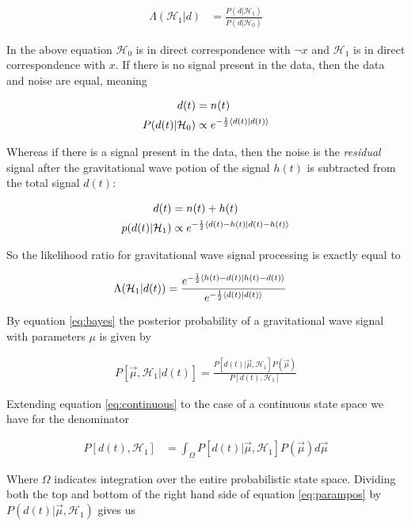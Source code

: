 \begin{align}
\Lambda(\mathcal{H}_1|d) &= \frac{P(d|\mathcal{H}_1)}{P(d|\mathcal{H}_0)}
\end{align}

In the above equation $\mathcal{H}_0$ is in direct correspondence with $\neg x$ and $\mathcal{H}_1$ is in direct correspondence with $x$. If there is no signal present in the data, then the data and noise are equal, meaning 

\begin{align}
d(t) &= n(t) \\
P(d(t)|\mathcal{H}_0) &\propto e^{-\frac{1}{2}\braket{d(t)|d(t)}}
\end{align} 

Whereas if there is a signal present in the data, then the noise is the \textit{residual} signal after the gravitational wave potion of the signal $h(t)$ is subtracted from the total signal $d(t)$: 

\begin{align}
d(t) &= n(t) + h(t) \\
p(d(t)|\mathcal{H}_1) &\propto e^{-\frac{1}{2}\braket{d(t) - h(t)|d(t) - h(t)}}
\end{align}

So the likelihood ratio for gravitational wave signal processing is exactly equal to 

\begin{align}
\Lambda(\mathcal{H}_1|d(t)) &= \frac{e^{-\frac{1}{2}\braket{h(t)-d(t)|h(t)-d(t)}}}{e^{-\frac{1}{2}\braket{d(t)|d(t)}}}
\end{align}

By equation \ref{eq:bayes}  the posterior probability of a gravitational wave signal with parameters $\mu$ is given by 

\begin{align}\label{eq:parampos}
P[\vec{\mu}, \mathcal{H}_1|d(t)] = \frac{P[d(t)|\vec{\mu}, \mathcal{H}_1]P(\vec{\mu})}{P[d(t), \mathcal{H}_1]}
\end{align}

Extending equation \ref{eq:continuous} to the case of a continuous state space we have for the denominator

\begin{align}
P[d(t), \mathcal{H}_1] &= \int_{\Omega}P[d(t)|\vec{\mu}, \mathcal{H}_1]P(\vec{\mu})d\vec{\mu}
\end{align}

Where $\Omega$ indicates integration over the entire probabilistic state space. Dividing both the top and bottom of the right hand side of equation \ref{eq:parampos} by $P(d(t)|\vec{\mu}, \mathcal{H}_1)$ gives us 

